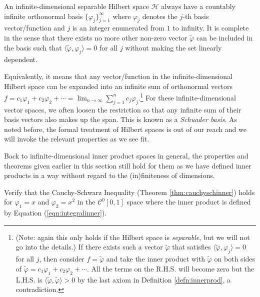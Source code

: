 \begin{proper}
\label{proper:hilbertorthosys}
An infinite-dimensional separable Hilbert space $\mathcal{H}$ always have a countably infinite orthonormal basis $\{\varphi_j\}_{j=1}^{\infty}$ where $\varphi_j$ denotes the $j$-th basis vector/function and $j$ is an integer enumerated from $1$ to infinity. It is complete in the sense that there exists no more other non-zero vector $\tilde{\varphi}$ can be included in the basis such that $\langle \tilde{\varphi}, \varphi_j \rangle = 0$ for all $j$ without making the set linearly dependent.
\end{proper}
Equivalently, it means that any vector/function in the infinite-dimensional Hilbert space can be expanded into an infinite sum of orthonormal vectors $f = c_1\varphi_1 + c_2\varphi_2 + \cdots = \lim_{n \to \infty} \sum_{j=1}^{n} c_j \varphi_j$.\footnote{(Note: again this only holds if the Hilbert space is \textit{separable}, but we will not go into the details.) If there exists such a vector $\tilde{\varphi}$ that satisfies $\langle \tilde{\varphi}, \varphi_j \rangle = 0$ for all $j$, then consider $f = \tilde{\varphi}$ and take the inner product with $\tilde{\varphi}$ on both sides of $\tilde{\varphi} = c_1\varphi_1 + c_2\varphi_2 + \cdots$. All the terms on the R.H.S. will become zero but the L.H.S. is $\langle \tilde{\varphi}, \tilde{\varphi} \rangle > 0$ by the last axiom in Definition \ref{defn:innerprod}, a contradiction.} For these infinite-dimensional vector spaces, we often loosen the restriction so that any infinite sum of their basis vectors also makes up the span. This is known as a \textit{Schuader basis}. As noted before, the formal treatment of Hilbert spaces is out of our reach and we will invoke the relevant properties as we see fit.\par
Back to infinite-dimensional inner product spaces in general, the properties and theorems given earlier in this section still hold for them as we have defined inner products in a way without regard to the (in)finiteness of dimensions.
\begin{exmp}
Verify that the Cauchy-Schwarz Inequality (Theorem \ref{thm:cauchyschinner}) holds for $\varphi_1 = x$ and $\varphi_2 = x^2$ in the $\mathcal{C}^0[0,1]$ space where the inner product is defined by Equation (\ref{eqn:integralinner}).
\end{exmp}
